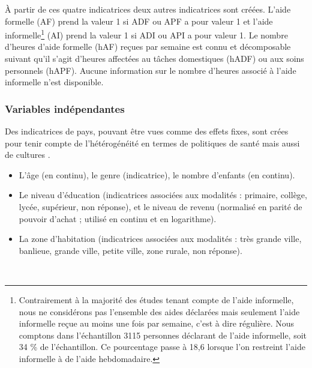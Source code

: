 \begin{Article}
\begin{refsection}[Bonnal]
À partir de ces quatre indicatrices deux autres indicatrices sont créées. L'aide formelle (AF) prend la valeur 1 si ADF ou APF a pour valeur 1 et l'aide informelle\footnote{Contrairement à la majorité des études tenant compte de  l’aide informelle, nous ne considérons pas l’ensemble des aides déclarées mais seulement l’aide informelle reçue au moins une fois par semaine, c’est à dire régulière. Nous comptons dans l'échantillon 3115 personnes déclarant de l'aide informelle, soit 34 \% de l'échantillon. Ce pourcentage passe à 18,6 lorsque l'on restreint l'aide informelle à de l'aide hebdomadaire.} (AI) prend la valeur 1 si ADI ou API a pour valeur 1.
Le nombre d'heures d'aide formelle (hAF) reçues par semaine est connu et décomposable suivant qu'il s'agit d'heures affectées au tâches domestiques (hADF) ou aux soins personnels (hAPF). Aucune information sur le nombre d'heures associé à l'aide informelle n'est disponible.


\subsubsection{Variables indépendantes}

\noindent Des indicatrices de pays, pouvant être vues comme des effets fixes, sont crées pour tenir compte de l'hétérogénéité en termes de politiques de santé mais aussi de cultures \parencite{REHER1998}.\\



\begin{itemize}
\item  L'âge (en continu), le genre (indicatrice), le nombre d'enfants (en continu).
\item  Le niveau d'éducation (indicatrices associées aux modalités : primaire, collège, lycée, supérieur, non réponse), et le niveau de revenu (normalisé en parité de pouvoir d'achat ; utilisé en continu et en logarithme).
\item  La zone d'habitation (indicatrices associées aux modalités : très grande ville, banlieue, grande ville, petite ville, zone rurale, non réponse).
\end{itemize}

\\


\end{refsection}
\end{Article}
